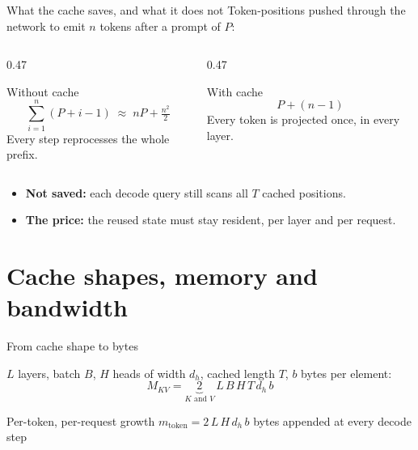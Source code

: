 \documentclass[handout]{beamer}
\begin{document}
\begin{frame}{What the cache saves, and what it does not}
  Token-positions pushed through the network to emit $n$ tokens after a prompt of $P$:
  \begin{columns}[t]
    \begin{column}{0.47\linewidth}
      \begin{alertblock}{Without cache}
        \[
          \sum_{i=1}^{n}(P+i-1)\;\approx\;nP+\tfrac{n^2}{2}
        \]
        Every step reprocesses the whole prefix.
      \end{alertblock}
    \end{column}
    \begin{column}{0.47\linewidth}
      \begin{block}{With cache}
        \[
          P+(n-1)
        \]
        Every token is projected once, in every layer.
      \end{block}
    \end{column}
  \end{columns}
  \vfill
  \begin{itemize}
      \setlength{\itemsep}{5pt}
    \item \textbf{Not saved:} each decode query still scans all $T$ cached positions.
    \item \textbf{The price:} the reused state must stay resident, per layer and per request.
  \end{itemize}
\end{frame}

\section{Cache shapes, memory and bandwidth}

\begin{frame}{From cache shape to bytes}
  \centering
  \par\vspace{4pt}
  \small\raggedright
  $L$ layers, batch $B$, $H$ heads of width $d_h$, cached length $T$, $b$ bytes per element:
  \[
    M_{KV}=\underbrace{2}_{K\text{ and }V}\,L\,B\,H\,T\,d_h\,b
  \]
  \begin{block}{Per-token, per-request growth}
    \centering $m_{\text{token}}=2\,L\,H\,d_h\,b$ bytes appended at every decode step
  \end{block}
\end{frame}
\end{document}
